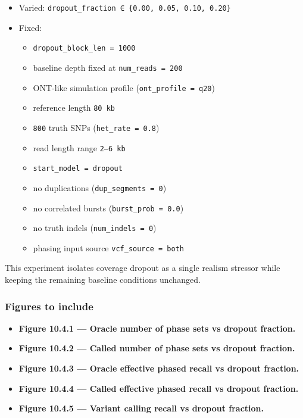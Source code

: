 \documentclass[
]{article}
\providecommand{\tightlist}{%
  \setlength{\itemsep}{0pt}\setlength{\parskip}{0pt}}
\begin{document}
\begin{itemize}
\tightlist
\item
  Varied: \texttt{dropout\_fraction\ ∈\ \{0.00,\ 0.05,\ 0.10,\ 0.20\}}
\item
  Fixed:

  \begin{itemize}
  \tightlist
  \item
    \texttt{dropout\_block\_len\ =\ 1000}
  \item
    baseline depth fixed at \texttt{num\_reads\ =\ 200}
  \item
    ONT-like simulation profile (\texttt{ont\_profile\ =\ q20})
  \item
    reference length \texttt{80\ kb}
  \item
    \texttt{800} truth SNPs (\texttt{het\_rate\ =\ 0.8})
  \item
    read length range \texttt{2–6\ kb}
  \item
    \texttt{start\_model\ =\ dropout}
  \item
    no duplications (\texttt{dup\_segments\ =\ 0})
  \item
    no correlated bursts (\texttt{burst\_prob\ =\ 0.0})
  \item
    no truth indels (\texttt{num\_indels\ =\ 0})
  \item
    phasing input source \texttt{vcf\_source\ =\ both}
  \end{itemize}
\end{itemize}

This experiment isolates coverage dropout as a single realism stressor
while keeping the remaining baseline conditions unchanged.

\subsubsection{Figures to include}\label{figures-to-include-2}

\begin{itemize}
\tightlist
\item
  \textbf{Figure 10.4.1 --- Oracle number of phase sets vs dropout
  fraction.}
\item
  \textbf{Figure 10.4.2 --- Called number of phase sets vs dropout
  fraction.}
\item
  \textbf{Figure 10.4.3 --- Oracle effective phased recall vs dropout
  fraction.}
\item
  \textbf{Figure 10.4.4 --- Called effective phased recall vs dropout
  fraction.}
\item
  \textbf{Figure 10.4.5 --- Variant calling recall vs dropout fraction.}
\end{itemize}
\end{document}
